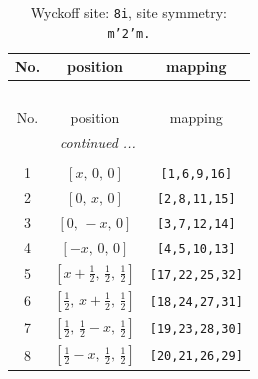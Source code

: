 \documentclass[fleqn,8pt]{jsarticle}
\begin{document}
\begin{longtable}{ccc}
\caption{Wyckoff site: {\tt 8i}, site symmetry: {\tt m'2'm.}}
 \\
 \hline \hline
No. & position & mapping \\ \hline \endfirsthead

\multicolumn{2}{l}{\tablename\ \thetable{}} \\
 \hline \hline
No. & position & mapping \\ \hline \endhead

 \hline \hline
\multicolumn{2}{r}{\footnotesize\it continued ...} \\ \endfoot

 \hline \hline
\multicolumn{2}{r}{} \\ \endlastfoot

1 & $\left[ x,\, 0,\, 0 \right]$ & {\tt [1,6,9,16]} \\ \hline
2 & $\left[ 0,\, x,\, 0 \right]$ & {\tt [2,8,11,15]} \\ \hline
3 & $\left[ 0,\, - x,\, 0 \right]$ & {\tt [3,7,12,14]} \\ \hline
4 & $\left[ - x,\, 0,\, 0 \right]$ & {\tt [4,5,10,13]} \\ \hline
5 & $\left[ x + \frac{1}{2},\, \frac{1}{2},\, \frac{1}{2} \right]$ & {\tt [17,22,25,32]} \\ \hline
6 & $\left[ \frac{1}{2},\, x + \frac{1}{2},\, \frac{1}{2} \right]$ & {\tt [18,24,27,31]} \\ \hline
7 & $\left[ \frac{1}{2},\, \frac{1}{2} - x,\, \frac{1}{2} \right]$ & {\tt [19,23,28,30]} \\ \hline
8 & $\left[ \frac{1}{2} - x,\, \frac{1}{2},\, \frac{1}{2} \right]$ & {\tt [20,21,26,29]} \\
\end{longtable}
\renewcommand{\arraystretch}{1.2}
\end{document}
